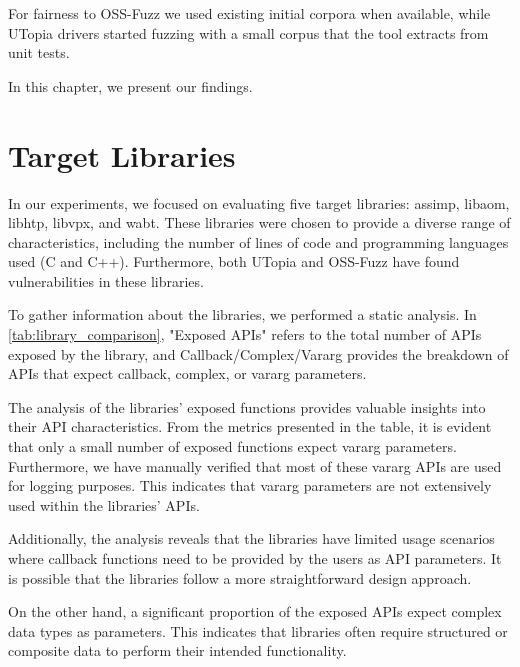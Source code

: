 \documentclass[a4paper,11pt,oneside]{report}
\begin{document}
For fairness to OSS-Fuzz we used existing initial corpora when available,
while UTopia drivers started fuzzing with a small corpus that the tool
extracts from unit tests.

In this chapter, we present our findings.


\section{Target Libraries}
In our experiments, we focused on evaluating five target libraries: 
assimp, libaom, libhtp, libvpx, and wabt. These libraries were chosen 
to provide a diverse range of characteristics, including the number of 
lines of code and programming languages used (C and C++). Furthermore, 
both UTopia and OSS-Fuzz have found vulnerabilities in these libraries.

To gather information about the libraries, we performed a static analysis.
In \autoref{tab:library_comparison}, 
"Exposed APIs" refers to the total number of APIs exposed by the library, 
and Callback/Complex/Vararg provides the breakdown of APIs that expect 
callback, complex, or vararg parameters.

The analysis of the libraries' exposed functions provides valuable
insights into their API characteristics. From the metrics presented 
in the table, it is evident that only a small number of exposed 
functions expect vararg parameters. Furthermore, we have manually 
verified that most of these vararg APIs are used for logging purposes. 
This indicates that vararg parameters are not extensively used 
within the libraries' APIs.

Additionally, the analysis reveals that the libraries have limited
usage scenarios where callback functions need to be provided by the users 
as API parameters. It is possible that the libraries follow a
more straightforward design approach.

On the other hand, a significant proportion of the exposed APIs 
expect complex data types as parameters. This indicates that  
libraries often require structured or composite data to perform 
their intended functionality.
\end{document}
